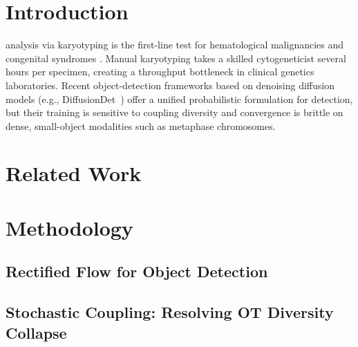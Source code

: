 \documentclass[journal,10pt]{IEEEtran}
\begin{document}
\section{Introduction}
\label{sec:intro}

 analysis via karyotyping is the first-line
test for hematological malignancies and congenital syndromes
\cite{example_ref_2024}. Manual karyotyping takes a skilled
cytogeneticist several hours per specimen, creating a throughput
bottleneck in clinical genetics laboratories. Recent object-detection
frameworks based on denoising diffusion models (e.g.,
DiffusionDet~\cite{diffusiondet}) offer a unified probabilistic
formulation for detection, but their training is sensitive to
coupling diversity and convergence is brittle on dense, small-object
modalities such as metaphase chromosomes.


\section{Related Work}
\label{sec:related}


\section{Methodology}
\label{sec:method}

\subsection{Rectified Flow for Object Detection}

\subsection{Stochastic Coupling: Resolving OT Diversity Collapse}
\end{document}
